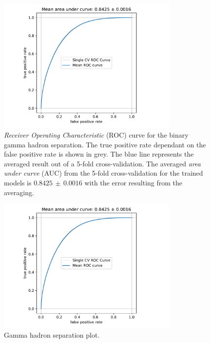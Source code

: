 \begin{figure}
  \centering
  \includegraphics[width=0.8\textwidth, page=1]{Plots/results/DBSCAN/separation_performance.pdf}
  \caption{\textit{Receiver Operating Characteristic} (ROC) curve for the binary gamma hadron separation. The true positive rate dependant on the false positive rate is shown in grey. The blue line represents the averaged result out of a 5-fold cross-validation. The averaged \textit{area under curve} (AUC) from the 5-fold cross-validation for the trained models is $0.8425\,\pm\,0.0016$ with the error resulting from the averaging.}
  \label{fig:sep_auc}
\end{figure}
%
%
\begin{figure}
  \centering
  \includegraphics[width=0.8\textwidth, page=3]{Plots/results/DBSCAN/separation_performance.pdf}
  \caption{Gamma hadron separation plot.}
  \label{fig:sep2}
\end{figure}
%
